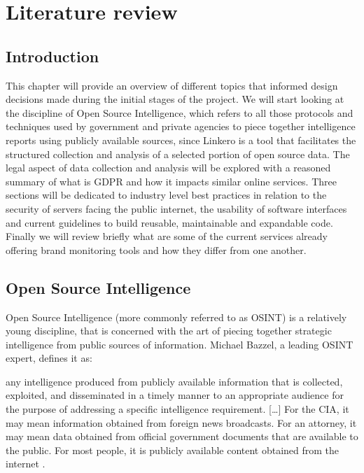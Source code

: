 \chapter{Literature review}

\section{Introduction}
This chapter will provide an overview of different topics that informed design
decisions made during the initial stages of the project. We will start looking
at the discipline of Open Source Intelligence, which refers to all those
protocols and techniques used by government and private agencies to piece
together intelligence reports using publicly available sources, since Linkero is
a tool that facilitates the structured collection and analysis of a selected
portion of open source data. The legal aspect of data collection and analysis
will be explored with a reasoned summary of what is GDPR and how it impacts
similar online services. Three sections will be dedicated to industry level best
practices in relation to the security of servers facing the public internet, the
usability of software interfaces and current guidelines to build reusable,
maintainable and expandable code. Finally we will review briefly what are some of
the current services already offering brand monitoring tools and how they differ
from one another.


\section{Open Source Intelligence}
Open Source Intelligence (more commonly referred to as OSINT) is a relatively
young discipline, that is concerned with the art of piecing together strategic
intelligence from public sources of information. Michael Bazzel, a leading OSINT expert,
defines it as:
\begin{displayquote}
any intelligence produced from publicly available information that is collected,
exploited, and disseminated in a timely manner to an appropriate audience for
the purpose of addressing a specific intelligence requirement. [\ldots] For the
CIA, it may mean information obtained from foreign news broadcasts. For an
attorney, it may mean data obtained from official government documents that are available to the
public. For most people, it is publicly available content obtained from the
internet \cite{MB15}.
\end{displayquote}

